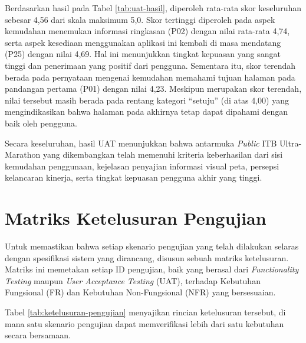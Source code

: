 Berdasarkan hasil pada Tabel \ref{tab:uat-hasil}, diperoleh rata-rata skor keseluruhan sebesar 4,56 dari skala maksimum 5,0. Skor tertinggi diperoleh pada aspek kemudahan menemukan informasi ringkasan (P02) dengan nilai rata-rata 4,74, serta aspek kesediaan menggunakan aplikasi ini kembali di masa mendatang (P25) dengan nilai 4,69. Hal ini menunjukkan tingkat kepuasan yang sangat tinggi dan penerimaan yang positif dari pengguna. Sementara itu, skor terendah berada pada pernyataan mengenai kemudahan memahami tujuan halaman pada pandangan pertama (P01) dengan nilai 4,23. Meskipun merupakan skor terendah, nilai tersebut masih berada pada rentang kategori “setuju” (di atas 4,00) yang mengindikasikan bahwa halaman pada akhirnya tetap dapat dipahami dengan baik oleh pengguna.

Secara keseluruhan, hasil UAT menunjukkan bahwa antarmuka \textit{Public} ITB Ultra-Marathon yang dikembangkan telah memenuhi kriteria keberhasilan dari sisi kemudahan penggunaan, kejelasan penyajian informasi visual peta, persepsi kelancaran kinerja, serta tingkat kepuasan pengguna akhir yang tinggi.

\section{Matriks Ketelusuran Pengujian}
Untuk memastikan bahwa setiap skenario pengujian yang telah dilakukan selaras dengan spesifikasi sistem yang dirancang, disusun sebuah matriks ketelusuran. Matriks ini memetakan setiap ID pengujian, baik yang berasal dari \textit{Functionality Testing} maupun \textit{User Acceptance Testing} (UAT), terhadap Kebutuhan Fungsional (FR) dan Kebutuhan Non-Fungsional (NFR) yang bersesuaian. 

Tabel \ref{tab:ketelusuran-pengujian} menyajikan rincian ketelusuran tersebut, di mana satu skenario pengujian dapat memverifikasi lebih dari satu kebutuhan secara bersamaan.
